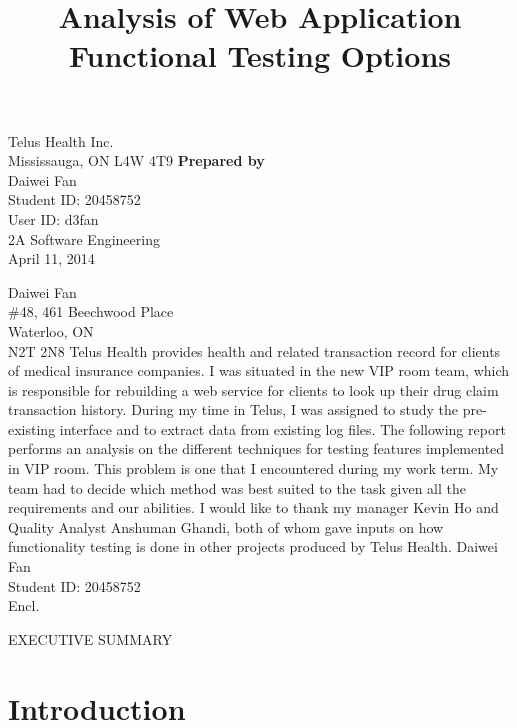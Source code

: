 \documentclass[12pt]{article}
\begin{document}
\title{Analysis of Web Application Functional Testing Options}
{
	Telus Health Inc.\\
	Mississauga, ON L4W 4T9
}
{
	\textbf{Prepared by}\\[2ex]
	
	Daiwei Fan\\
	Student ID: 20458752\\
	User ID: d3fan\\
	2A Software Engineering\\
	April 11, 2014
}


{
	\noindent
	Daiwei Fan\\
	\#48, 461 Beechwood Place\\
	Waterloo, ON\\
	N2T 2N8
}
{
	Telus Health provides health and related transaction record for clients of medical insurance companies. I was situated in the new VIP room team, which is responsible for rebuilding a web service for clients to look up their drug claim transaction history. During my time in Telus, I was assigned to study the pre-existing interface and to extract data from existing log files.
}
{
	The following report performs an analysis on the different techniques for testing features implemented in VIP room. This problem is one that I encountered during my work term. My team had to decide which method was best suited to the task given all the requirements and our abilities.
}
{
	I would like to thank my manager Kevin Ho and Quality Analyst Anshuman Ghandi, both of whom gave inputs on how functionality testing is done in other projects produced by Telus Health.
}
{
	Daiwei Fan\\
	Student ID: 20458752\\[2ex]
	Encl.
}


EXECUTIVE SUMMARY



\newpage

\toc


\section{Introduction}
\end{document}
